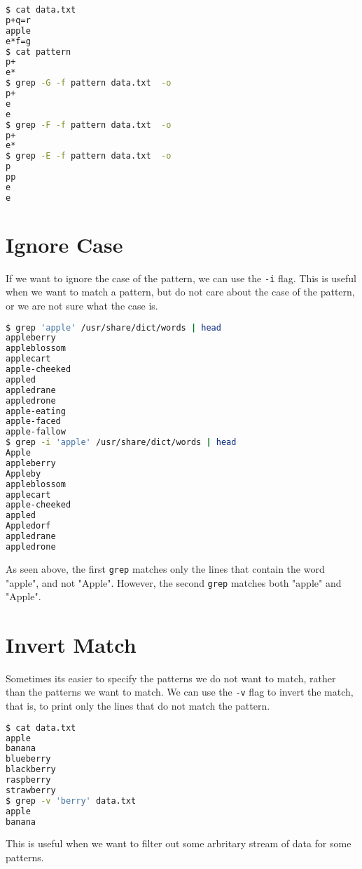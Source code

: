 \begin{lstlisting}[language=bash]
$ cat data.txt
p+q=r
apple
e*f=g
$ cat pattern
p+
e*
$ grep -G -f pattern data.txt  -o
p+
e
e
$ grep -F -f pattern data.txt  -o
p+
e*
$ grep -E -f pattern data.txt  -o
p
pp
e
e
\end{lstlisting}

\section{Ignore Case}

If we want to ignore the case of the pattern, we can use the \lstinline|-i| flag. This is useful when we want to match a pattern, but do not care about the case of the pattern, or we are not sure what the case is.

\begin{lstlisting}[language=bash]
$ grep 'apple' /usr/share/dict/words | head
appleberry
appleblossom
applecart
apple-cheeked
appled
appledrane
appledrone
apple-eating
apple-faced
apple-fallow
$ grep -i 'apple' /usr/share/dict/words | head
Apple
appleberry
Appleby
appleblossom
applecart
apple-cheeked
appled
Appledorf
appledrane
appledrone
\end{lstlisting}

As seen above, the first \lstinline|grep| matches only the lines that contain the word "apple", and not "Apple". However, the second \lstinline|grep| matches both "apple" and "Apple".

\section{Invert Match}

Sometimes its easier to specify the patterns we do not want to match, rather than the patterns we want to match. We can use the \lstinline|-v| flag to invert the match, that is, to print only the lines that do not match the pattern.

\begin{lstlisting}[language=bash]
$ cat data.txt
apple
banana
blueberry
blackberry
raspberry
strawberry
$ grep -v 'berry' data.txt
apple
banana
\end{lstlisting}

This is useful when we want to filter out some arbritary stream of data for some patterns.


